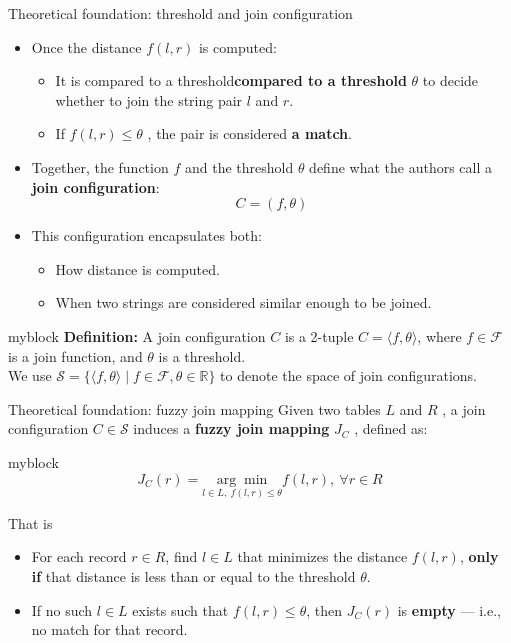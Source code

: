 \documentclass[8pt]{beamer} %
\begin{document}
\begin{frame}{Theoretical foundation: threshold and join configuration}
	
\begin{itemize}
	\item Once the distance $f(l, r)$ is computed:
	\begin{itemize}
		\item It is compared to a threshold\textbf{compared to a threshold} $\theta$  to decide whether to join the string pair $l$ and $r$.
		\item If $f(l, r) \leq \theta$ , the pair is considered \textbf{a match}.
	\end{itemize}
	\item 	Together, the function $f$ and the threshold $\theta$ define what the authors call a \textbf{join configuration}:$$
	C = (f, \theta)
	$$
	\item This configuration encapsulates both:
	\begin{itemize}
		\item How distance is computed.
		\item When two strings are considered similar enough to be joined.
	\end{itemize}
\end{itemize}	

\begin{beamercolorbox}[rounded=true, shadow=true, leftskip=1em, rightskip=1em]{myblock}
	\textbf{Definition:} A join configuration $C$ is a 2-tuple $C = \langle f, \theta \rangle$, where $f \in \mathcal{F}$ is a join function, and $\theta$ is a threshold.\\
	We use $\mathcal{S} = \{ \langle f, \theta \rangle \mid f \in \mathcal{F}, \theta \in \mathbb{R} \}$ to denote the space of join configurations.
\end{beamercolorbox}

\end{frame}


\begin{frame}{Theoretical foundation: fuzzy join mapping}
	Given two tables $L$  and $R$ , a join configuration $C \in \mathcal{S}$ induces a \textbf{fuzzy join mapping} $J_C$ , defined as:
	
	\begin{beamercolorbox}[rounded=true, shadow=true, leftskip=1em, rightskip=1em]{myblock}
	$$
		J_C(r) = \underset{l \in L,\ f(l, r) \leq \theta}{\arg\min} f(l, r),\ \forall r \in R
	$$
	\end{beamercolorbox}
	
	That is
	\begin{itemize}
		\item For each record $r \in R$, find $l \in L$ that minimizes the distance $f(l, r)$, \textbf{only if} that distance is less than or equal to the threshold $\theta$.
		\item If no such $l \in L$ exists such that $f(l, r) \leq \theta$, then $J_C(r)$ is \textbf{empty} — i.e., no match for that record.
	\end{itemize}

\end{frame}
\end{document}
